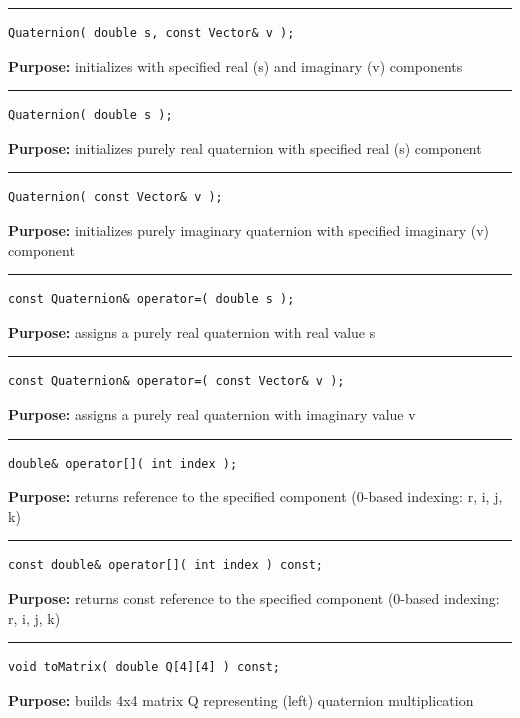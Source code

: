 \documentclass{article}
\begin{document}
\hspace{-.21in}\rule{5in}{1pt}
\begin{verbatim}
Quaternion( double s, const Vector& v );
\end{verbatim}
\textbf{Purpose:}
initializes with specified real (s) and imaginary (v) components

\hspace{-.21in}\rule{5in}{1pt}
\begin{verbatim}
Quaternion( double s );
\end{verbatim}
\textbf{Purpose:}
initializes purely real quaternion with specified real (s) component

\hspace{-.21in}\rule{5in}{1pt}
\begin{verbatim}
Quaternion( const Vector& v );
\end{verbatim}
\textbf{Purpose:}
initializes purely imaginary quaternion with specified imaginary (v) component

\hspace{-.21in}\rule{5in}{1pt}
\begin{verbatim}
const Quaternion& operator=( double s );
\end{verbatim}
\textbf{Purpose:}
assigns a purely real quaternion with real value s

\hspace{-.21in}\rule{5in}{1pt}
\begin{verbatim}
const Quaternion& operator=( const Vector& v );
\end{verbatim}
\textbf{Purpose:}
assigns a purely real quaternion with imaginary value v

\hspace{-.21in}\rule{5in}{1pt}
\begin{verbatim}
double& operator[]( int index );
\end{verbatim}
\textbf{Purpose:}
returns reference to the specified component (0-based indexing: r, i, j, k)

\hspace{-.21in}\rule{5in}{1pt}
\begin{verbatim}
const double& operator[]( int index ) const;
\end{verbatim}
\textbf{Purpose:}
returns const reference to the specified component (0-based indexing: r, i, j, k)

\hspace{-.21in}\rule{5in}{1pt}
\begin{verbatim}
void toMatrix( double Q[4][4] ) const;
\end{verbatim}
\textbf{Purpose:}
builds 4x4 matrix Q representing (left) quaternion multiplication
\end{document}
